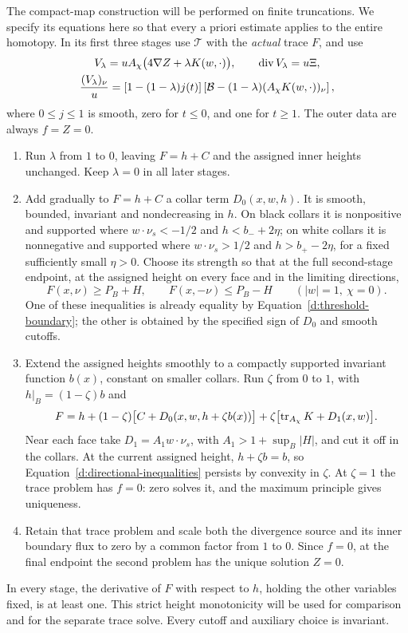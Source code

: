 The compact-map construction will be performed on finite
truncations.  We specify its equations here so that every a priori
estimate applies to the entire homotopy.  In its first three stages
use $\mathcal T$ with the \emph{actual} trace $F$, and use
\begin{gather}\label{d:homotopy-flux}
 V_\lambda=uA_\chi\bigl(4\nabla Z+\lambda K(w,\cdot)\bigr),\qquad
 \operatorname{div} V_\lambda=u\Xi,\\
 \frac{(V_\lambda)_\nu}{u}
 =[1-(1-\lambda)j(t)]
 \left[\mathcal B-(1-\lambda)(A_\chi K(w,\cdot))_\nu\right],
 \label{d:homotopy-boundary}
\end{gather}
where $0\le j\le1$ is smooth, zero for $t\le0$, and one for $t\ge1$.
The outer data are always $f=Z=0$.
\begin{enumerate}[label=\arabic*.]
\item Run $\lambda$ from $1$ to $0$, leaving $F=h+C$ and the assigned
inner heights unchanged.  Keep $\lambda=0$ in all later stages.
\item Add gradually to $F=h+C$ a collar term $D_0(x,w,h)$.  It is
smooth, bounded, invariant and nondecreasing in $h$.  On black
collars it is nonpositive and supported where
$w\cdot\nu_s<-1/2$ and $h<b_-+2\eta$; on white collars it is
nonnegative and supported where $w\cdot\nu_s>1/2$ and
$h>b_+-2\eta$, for a fixed sufficiently small $\eta>0$.
Choose its strength so that at the full second-stage endpoint,
at the assigned height on every face and in the limiting directions,
\begin{equation}\label{d:directional-inequalities}
 F(x,\nu)\ge P_B+H,\qquad F(x,-\nu)\le P_B-H
 \qquad(|w|=1,\ \chi=0).
\end{equation}
One of these inequalities is already equality by
Equation~\eqref{d:threshold-boundary}; the other is obtained by the
specified sign of $D_0$ and smooth cutoffs.
\item Extend the assigned heights smoothly to a compactly supported
invariant function $b(x)$, constant on smaller collars.  Run
$\zeta$ from $0$ to $1$, with $h|_B=(1-\zeta)b$ and
\begin{equation}\label{d:third-trace}
 F=h+(1-\zeta)\bigl[C+D_0(x,w,h+\zeta b(x))\bigr]
       +\zeta\bigl[\operatorname{tr}_{A_\chi}K+D_1(x,w)\bigr].
\end{equation}
Near each face take $D_1=A_1w\cdot\nu_s$, with
$A_1>1+\sup_B|H|$, and cut it off in the collars.  At the current
assigned height, $h+\zeta b=b$, so
Equation~\eqref{d:directional-inequalities} persists by convexity in
$\zeta$.  At $\zeta=1$ the trace problem has $f=0$: zero solves it,
and the maximum principle gives uniqueness.
\item Retain that trace problem and scale both the divergence source
and its inner boundary flux to zero by a common factor from $1$ to
$0$.  Since $f=0$, at the final endpoint the second problem has the
unique solution $Z=0$.
\end{enumerate}
In every stage, the derivative of $F$ with respect to $h$, holding
the other variables fixed, is at least one.  This strict height
monotonicity will be used for comparison and for the separate trace
solve.  Every cutoff and auxiliary choice is invariant.

